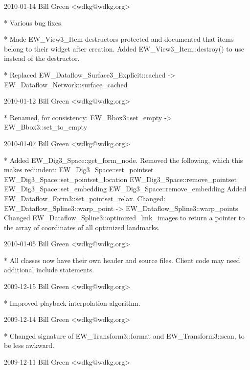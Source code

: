 \begin{DoxyVerbInclude}
2010-01-14  Bill Green  <wdkg@wdkg.org>

    * Various bug fixes.

    * Made EW_View3_Item destructors protected and documented that items
    belong to their widget after creation.
    Added EW_View3_Item::destroy() to use instead of the destructor.

    * Replaced
        EW_Dataflow_Surface3_Explicit::cached ->
         EW_Dataflow_Network::surface_cached


2010-01-12  Bill Green  <wdkg@wdkg.org>

    * Renamed, for consistency:
        EW_Bbox3::set_empty -> EW_Bbox3::set_to_empty


2010-01-07  Bill Green  <wdkg@wdkg.org>

    * Added EW_Dig3_Space::get_form_node.
    Removed the following, which this makes redundent:
        EW_Dig3_Space::set_pointset
        EW_Dig3_Space::set_pointset_location
        EW_Dig3_Space::remove_pointset
        EW_Dig3_Space::set_embedding
        EW_Dig3_Space::remove_embedding
    Added EW_Dataflow_Form3::set_pointset_relax.
    Changed:
        EW_Dataflow_Spline3::warp_point -> EW_Dataflow_Spline3::warp_points
    Changed EW_Dataflow_Spline3::optimized_lmk_images to return a pointer to
    the array of coordinates of all optimized landmarks.


2010-01-05  Bill Green  <wdkg@wdkg.org>

    * All classes now have their own header and source files.
    Client code may need additional include statements.


2009-12-15  Bill Green  <wdkg@wdkg.org>

    * Improved playback interpolation algorithm.


2009-12-14  Bill Green  <wdkg@wdkg.org>

    * Changed signature of EW_Transform3::format and EW_Transform3::scan,
    to be less awkward.


2009-12-11  Bill Green  <wdkg@wdkg.org>


\end{DoxyVerbInclude}
